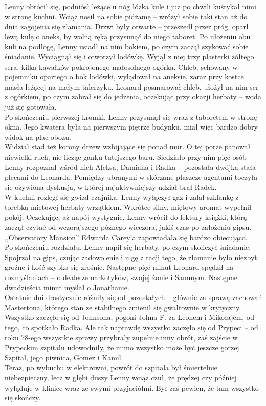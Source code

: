 \documentclass[../MAIN.tex]{subfiles}
\begin{document}
Lenny obrócił się, podniósł leżące u nóg łóżka kule i już po chwili kuśtykał nimi w stronę kuchni. Wciąż nosił na sobie pidżamę -- wróżył sobie taki stan aż do dnia zagojenia się złamania.
Drzwi były otwarte -- przeszedł przez próg, oparł lewą kulę o aneks, by wolną ręką przysunąć do niego taboret. Po ułożeniu obu kuli na podłogę, Lenny usiadł na nim bokiem, po czym zaczął szykować sobie śniadanie. Wyciągnął się i otworzył lodówkę. Wyjął z niej trzy plasterki żółtego sera, kilka kawałków pokrojonego małosolnego ogórka. Chleb, schowany w pojemniku opartego o bok lodówki, wylądował na aneksie, zaraz przy kostce masła leżącej na małym talerzyku. Leonard posmarował chleb, ułożył na nim ser z ogórkiem, po czym zabrał się do jedzenia, oczekując przy okazji herbaty -- woda już się gotowała.\\
Po skończeniu pierwszej kromki, Lenny przysunął się wraz z taboretem w stronę okna. Jego kwatera była na pierwszym piętrze budynku, miał więc bardzo dobry widok na plac obozu.
\\
Widział  stąd też korony drzew wzbijające się ponad mur. O tej porze panował niewielki ruch, nie licząc ganku tutejszego baru. Siedziało przy nim pięć osób -- Lenny rozpoznał wśród nich Aleksa, Damiana i Radka -- pozostała dwójka stała plecami do Leonarda. Pomiędzy ubranymi w skórzane płaszcze agentami toczyła się ożywiona dyskusja, w której najaktywniejszy udział brał Radek.\\
W kuchni rozległ się gwizd czajnika. Lenny wyłączył gaz i zalał szklankę z torebką miętowej herbaty wrzątkiem. Wkrótce silny, miętowy aromat wypełnił pokój. Oczekując, aż napój wystygnie, Lenny wrócił do lektury książki, którą zaczął czytać od wczorajszego późnego wieczora, jakiś czas po założeniu gipsu. ,,Observatory Mansion'' Edwarda Carey’a zapowiadała się bardzo obiecująco.\\
Po skończeniu rozdziału, Lenny napił się herbaty, po czym skończył śniadanie. Spojrzał na gips, czując zadowolenie i ulgę z racji tego, że złamanie było niezbyt groźne i kość szybko się zrośnie. Następne pięć minut Leonard spędził na rozmyślaniach -- o dealerze narkotyków, swojej żonie i Sammym. Następne dwadzieścia minut myślał o Jonathanie.\\
Ostatnie dni drastycznie różniły się od pozostałych -- głównie za sprawą zachowań Mastertona, którego stan ze stabilnego zmienił się gwałtownie w krytyczny. Wszystko zaczęło się od Johnsona, pogoni Johna F. za Leonem i Mikołajem, od tego, co spotkało Radka. Ale tak naprawdę wszystko zaczęło się od Prypeci -- od roku 78-ego wszystkie sprawy przybrały zupełnie inny obrót, zaś zajście w Prypeckim szpitalu udowodniły, że mimo wszystko może być jeszcze gorzej. Szpital, jego piwnica, Gomez i Kamil.\\
Teraz, po wybuchu w elektrowni, powrót do szpitala był śmiertelnie niebezpieczny, lecz w głębi duszy Lenny wciąż czuł, że prędzej czy później wyląduje w klinice wraz ze swymi przyjaciółmi. Był zaś pewien, że tam wszystko się skończy.
\end{document}
